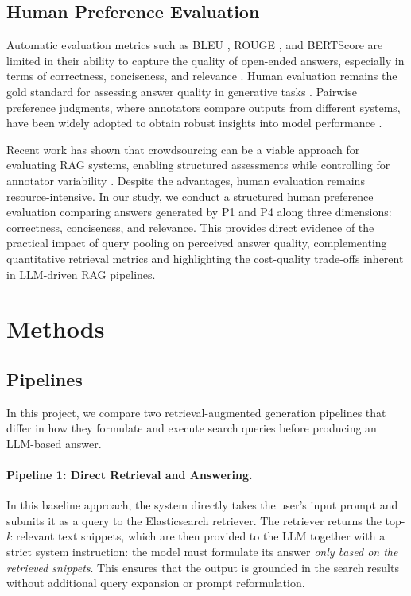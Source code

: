 \documentclass[manuscript,screen]{acmart}
\begin{document}
\begin{CCSXML}
\subsection{Human Preference Evaluation}
Automatic evaluation metrics such as BLEU \cite{post-2018-call}, ROUGE \cite{lin-2004-rouge}, and BERTScore \cite{zhang2020bertscoreevaluatingtextgeneration} are limited in their ability to capture the quality of open-ended answers, especially in terms of correctness, conciseness, and relevance \cite{karpukhin-etal-2020-dense}. Human evaluation remains the gold standard for assessing answer quality in generative tasks \cite{bai2022traininghelpfulharmlessassistant,thoppilan2022lamdalanguagemodelsdialog}. Pairwise preference judgments, where annotators compare outputs from different systems, have been widely adopted to obtain robust insights into model performance \cite{stiennon2022learningsummarizehumanfeedback}. 

Recent work has shown that crowdsourcing can be a viable approach for evaluating RAG systems, enabling structured assessments while controlling for annotator variability \cite{Gienapp_2025}. Despite the advantages, human evaluation remains resource-intensive. In our study, we conduct a structured human preference evaluation comparing answers generated by P1 and P4 along three dimensions: correctness, conciseness, and relevance. This provides direct evidence of the practical impact of query pooling on perceived answer quality, complementing quantitative retrieval metrics and highlighting the cost-quality trade-offs inherent in LLM-driven RAG pipelines.


\section{Methods}

	\subsection{Pipelines}
	
	In this project, we compare two retrieval-augmented generation pipelines that
	differ in how they formulate and execute search queries before producing an
	LLM-based answer.
	
	\paragraph{Pipeline 1: Direct Retrieval and Answering.}
	In this baseline approach, the system directly takes the user’s input prompt
	and submits it as a query to the Elasticsearch retriever. The retriever returns the top-$k$ relevant text
	snippets, which are then provided to the LLM together with a
	strict system instruction: the model must formulate its answer \emph{only based
	on the retrieved snippets}. This ensures that the output is grounded in the
	search results without additional query expansion or prompt reformulation.
	

\end{CCSXML}
\end{document}
